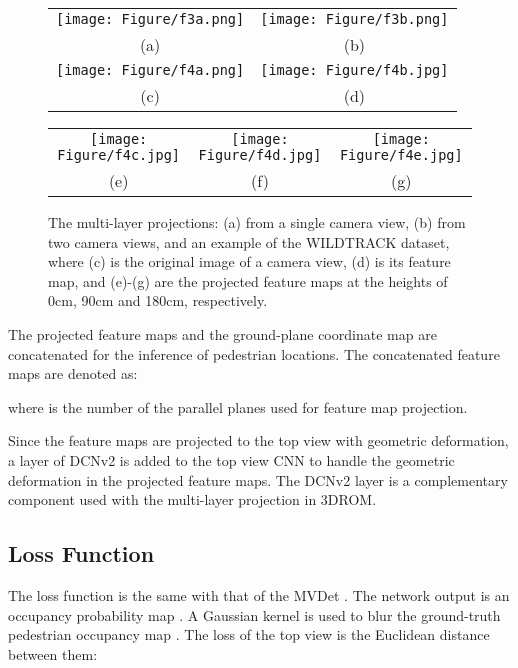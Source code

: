 \documentclass[runningheads]{llncs}
\begin{document}
	\begin{figure}[t]
		\begin{center}
			\begin{tabular}{cc}
				\texttt{[image: Figure/f3a.png]}&
				\texttt{[image: Figure/f3b.png]}\\
				(a) & (b)\\
				\texttt{[image: Figure/f4a.png]}&
				\texttt{[image: Figure/f4b.jpg]} \\
				(c) & (d)\\
			\end{tabular}
			
			\begin{tabular}{ccc}
				\texttt{[image: Figure/f4c.jpg]} &
				\texttt{[image: Figure/f4d.jpg]} &
				\texttt{[image: Figure/f4e.jpg]} \\
				(e)&(f)&(g)\\
			\end{tabular}
			\caption{The multi-layer projections: (a) from a single camera view, (b) from two camera views, and an example of the WILDTRACK dataset, where (c) is the original image of a camera view, (d) is its feature map, and (e)-(g) are the projected feature maps at the heights of 0cm, 90cm and 180cm, respectively.
			}
			\label{f4}
		\end{center}
	\end{figure}
	
	
	The projected feature maps and the ground-plane coordinate map are concatenated for the inference of pedestrian locations. The concatenated feature maps are denoted as:
	
	where  is the number of the parallel planes used for feature map projection.
	
	Since the feature maps are projected to the top view with geometric deformation, a layer of DCNv2 \cite{zhu2019deformable} is added to the top view CNN to handle the geometric deformation in the projected feature maps. The DCNv2 layer is a complementary component used with the multi-layer projection in 3DROM.
	
	
	
	\subsection{Loss Function}
	The loss function is the same with that of the MVDet \cite{hou2020multiview}. The network output is an occupancy probability map . A Gaussian kernel  is used to blur the ground-truth  pedestrian occupancy map . The loss of the top view  is the Euclidean distance between them:
	
\end{document}

